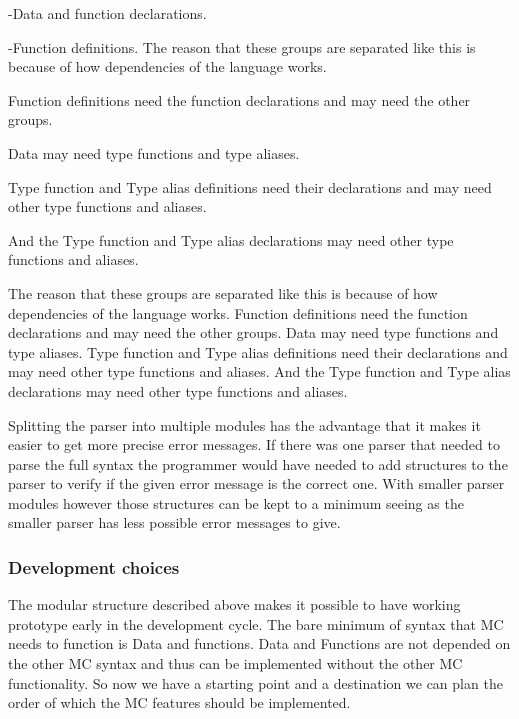 -Data and function declarations.

-Function definitions.
\linebreak
The reason that these groups are separated like this is because of how dependencies of the language works.

Function definitions need the function declarations and may need the other groups.

Data may need type functions and type aliases.

Type function and Type alias definitions need their declarations and may need other type functions and aliases.

And the Type function and Type alias declarations may need other type functions and aliases.

The reason that these groups are separated like this is because of how dependencies of the language works.
Function definitions need the function declarations and may need the other groups.
Data may need type functions and type aliases.
Type function and Type alias definitions need their declarations and may need other type functions and aliases.
And the Type function and Type alias declarations may need other type functions and aliases.

Splitting the parser into multiple modules has the advantage that it makes it easier to get more precise error messages. If there was one parser that needed to parse the full syntax the programmer would have needed to add structures to the parser to verify if the given error message is the correct one. With smaller parser modules however those structures can be kept to a minimum seeing as the smaller parser has less possible error messages to give. 

\subsubsection{Development choices}

The modular structure described above makes it possible to have working prototype early in the development cycle. The bare minimum of syntax that MC needs to function is Data and functions. Data and Functions are not depended on the other MC syntax and thus can be implemented without the other MC functionality. So now we have a starting point and a destination we can plan the order of which the MC features should be implemented.

